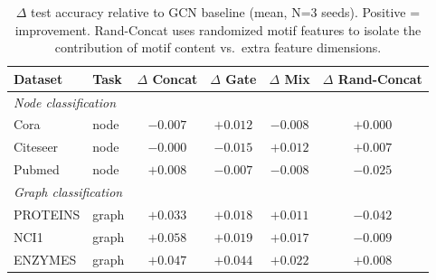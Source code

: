 \begin{table}[t]
\centering
\caption{$\Delta$ test accuracy relative to GCN baseline (mean, N=3 seeds). Positive = improvement. Rand-Concat uses randomized motif features to isolate the contribution of motif content vs.\ extra feature dimensions.}
\label{tab:delta_results}
\setlength{\tabcolsep}{5pt}
\begin{tabular}{llcccc}
\toprule
\textbf{Dataset} & \textbf{Task} & $\Delta$ \textbf{Concat} & $\Delta$ \textbf{Gate} & $\Delta$ \textbf{Mix} & $\Delta$ \textbf{Rand-Concat} \\
\midrule
\multicolumn{6}{l}{\textit{Node classification}} \\
Cora      & node  & $-0.007$ & $+0.012$        & $-0.008$ & $+0.000$ \\
Citeseer  & node  & $-0.000$ & $-0.015$        & $+0.012$ & $+0.007$ \\
Pubmed    & node  & $+0.008$ & $-0.007$        & $-0.008$ & $-0.025$ \\
\midrule
\multicolumn{6}{l}{\textit{Graph classification}} \\
PROTEINS  & graph & $\mathbf{+0.033}$ & $+0.018$ & $+0.011$ & $-0.042$ \\
NCI1      & graph & $\mathbf{+0.058}$ & $+0.019$ & $+0.017$ & $-0.009$ \\
ENZYMES   & graph & $\mathbf{+0.047}$ & $+0.044$ & $+0.022$ & $+0.008$ \\
\bottomrule
\end{tabular}
\end{table}
